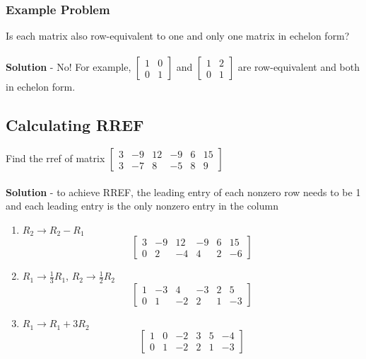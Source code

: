 \subsubsection{Example Problem}
Is each matrix also row-equivalent to one and only one matrix in echelon form? \\\\
\textbf{Solution} - No! For example, $\begin{bmatrix}
  1 & 0 \\
  0 & 1
\end{bmatrix}$ and $\begin{bmatrix}
  1 & 2 \\
  0 & 1
\end{bmatrix}$ are row-equivalent and both in echelon form.
\subsection{Calculating RREF}
Find the rref of matrix $\begin{bmatrix}
  3 & -9 & 12 & -9 & 6 & 15 \\
  3 & -7 & 8 & -5 & 8 & 9
\end{bmatrix}$ \\\\
\textbf{Solution} - to achieve RREF, the leading entry of each nonzero row needs to be 1 and each leading entry is the only nonzero entry in the column 
\begin{enumerate}
  \item $R_2 \rightarrow R_2 - R_1$
    \[
      \begin{bmatrix}
        3 & -9 & 12 & -9 & 6 & 15 \\
        0 & 2 & -4 & 4 & 2 & -6
      \end{bmatrix}
    \]
  \item $R_1 \rightarrow \frac{1}{3}R_1$, $R_2 \rightarrow \frac{1}{2}R_2$
    \[
      \begin{bmatrix}
        1 & -3 & 4 & -3 & 2 & 5 \\
        0 & 1 & -2 & 2 & 1 & -3
      \end{bmatrix}
    \]
  \item $R_1 \rightarrow R_1 + 3R_2$
    \[
      \begin{bmatrix}
        1 & 0 & -2 & 3 & 5 & -4 \\
        0 & 1 & -2 & 2 & 1 & -3
      \end{bmatrix}
    \]
\end{enumerate} \\\\
